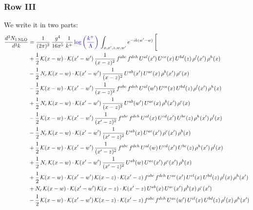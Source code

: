 \documentclass[9pt]{article}
\numberwithin{equation}{section}
\begin{document}
\subsubsection{Row III}
We write it in two parts: 
\begin{align}
\frac{d^{3}N_{1\,\mathrm{NLO}}}{d^{3}k} & = \frac{1}{(2\pi)^{3}}\,\frac{g^{4}}{16\pi^{5}}\,\frac{1}{k^{+}}\,{\color{blue}\log{\left(\frac{k^{+}}{\Lambda}\right)}}\,\int_{x,x',z,w,w'}e^{-ik(w'-w)}\,\Bigg[\notag\\ &  +\frac{1}{2}\,\mathcal{K}(x-w)\cdot\mathcal{K}(x'-w')\,\frac{1}{(x-z)^{2}}\,f^{abc}\,f^{deh}\,U^{al}(x')\,U^{ce}(x)\,U^{bd}(z)\,\rho^{l}(x')\,\rho^{h}(x)\notag\\
& -\frac{1}{2}\,N_{c}\,\mathcal{K}(x-w)\cdot\mathcal{K}(x'-w')\,\frac{1}{(x-z)^{2}}\,U^{ab}(x')\,U^{ac}(x)\,\rho^{b}(x')\,\rho^{c}(x)\notag\\
& -\frac{1}{2}\,\mathcal{K}(x-w)\cdot\mathcal{K}(x'-w')\,\frac{1}{(x-z)^{2}}\,f^{abc}\,f^{deh}\,U^{al}(w')\,U^{ce}(x)\,U^{bd}(z)\,\rho^{l}(x')\,\rho^{h}(x)\notag\\
& +\frac{1}{2}\,N_{c}\,\mathcal{K}(x-w)\cdot\mathcal{K}(x'-w')\,\frac{1}{(x-z)^{2}}\,U^{ab}(w')\,U^{ac}(x)\,\rho^{b}(x')\,\rho^{c}(x)\notag\\
& -\frac{1}{2}\,\mathcal{K}(x-w)\cdot\mathcal{K}(x'-w')\,\frac{1}{(x'-z)^{2}}\,f^{abc}\,f^{deh}\,U^{al}(x)\,U^{cd}(x')\,U^{be}(z)\,\rho^{h}(x')\,\rho^{l}(x)\notag\\
& -\frac{1}{2}\,N_{c}\,\mathcal{K}(x-w)\cdot\mathcal{K}(x'-w')\,\frac{1}{(x'-z)^{2}}\,U^{ab}(x)\,U^{ac}(x')\,\rho^{c}(x')\,\rho^{b}(x)\notag\\
& +\frac{1}{2}\,\mathcal{K}(x-w)\cdot\mathcal{K}(x'-w')\,\frac{1}{(x'-z)^{2}}\,f^{abc}\,f^{deh}\,U^{al}(w)\,U^{cd}(x')\,U^{be}(z)\,\rho^{h}(x')\,\rho^{l}(x)\notag\\
& +\frac{1}{2}\,N_{c}\,\mathcal{K}(x-w)\cdot\mathcal{K}(x'-w')\,\frac{1}{(x'-z)^{2}}\,U^{ab}(w)\,U^{ac}(x')\,\rho^{c}(x')\,\rho^{b}(x)\notag\\
& +\frac{1}{2}\,\mathcal{K}(x-w)\cdot\mathcal{K}(x'-w')\,\mathcal{K}(x-z)\cdot\mathcal{K}(x'-z)\,f^{abc}\,f^{deh}\,U^{ae}(x')\,U^{cl}(x)\,U^{bd}(z)\,\rho^{l}(x)\,\rho^{h}(x')\notag\\
& +N_{c}\,\mathcal{K}(x-w)\cdot\mathcal{K}(x'-w')\,\mathcal{K}(x-z)\cdot\mathcal{K}(x'-z)\,U^{ab}(x)\,U^{ac}(x')\,\rho^{b}(x)\,\rho^{c}(x')\notag\\
& -\frac{1}{2}\,\mathcal{K}(x-w)\cdot\mathcal{K}(x'-w')\,\mathcal{K}(x-z)\cdot\mathcal{K}(x'-z)\,f^{abc}\,f^{deh}\,U^{ae}(w')\,U^{cl}(x)\,U^{bd}(z)\,\rho^{l}(x)\,\rho^{h}(x')\notag\\

\end{align}
\end{document}
